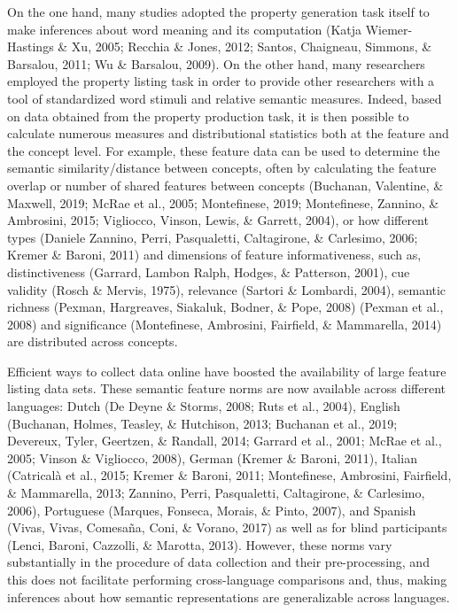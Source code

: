 \documentclass[man]{apa6}
\begin{document}
On the one hand, many studies adopted the property generation task itself to make inferences about word meaning and its computation (Katja Wiemer-Hastings \& Xu, 2005; Recchia \& Jones, 2012; Santos, Chaigneau, Simmons, \& Barsalou, 2011; Wu \& Barsalou, 2009). On the other hand, many researchers employed the property listing task in order to provide other researchers with a tool of standardized word stimuli and relative semantic measures. Indeed, based on data obtained from the property production task, it is then possible to calculate numerous measures and distributional statistics both at the feature and the concept level. For example, these feature data can be used to determine the semantic similarity/distance between concepts, often by calculating the feature overlap or number of shared features between concepts (Buchanan, Valentine, \& Maxwell, 2019; McRae et al., 2005; Montefinese, 2019; Montefinese, Zannino, \& Ambrosini, 2015; Vigliocco, Vinson, Lewis, \& Garrett, 2004), or how different types (Daniele Zannino, Perri, Pasqualetti, Caltagirone, \& Carlesimo, 2006; Kremer \& Baroni, 2011) and dimensions of feature informativeness, such as, distinctiveness (Garrard, Lambon Ralph, Hodges, \& Patterson, 2001), cue validity (Rosch \& Mervis, 1975), relevance (Sartori \& Lombardi, 2004), semantic richness (Pexman, Hargreaves, Siakaluk, Bodner, \& Pope, 2008) (Pexman et al., 2008) and significance (Montefinese, Ambrosini, Fairfield, \& Mammarella, 2014) are distributed across concepts.

Efficient ways to collect data online have boosted the availability of large feature listing data sets. These semantic feature norms are now available across different languages: Dutch (De Deyne \& Storms, 2008; Ruts et al., 2004), English (Buchanan, Holmes, Teasley, \& Hutchison, 2013; Buchanan et al., 2019; Devereux, Tyler, Geertzen, \& Randall, 2014; Garrard et al., 2001; McRae et al., 2005; Vinson \& Vigliocco, 2008), German (Kremer \& Baroni, 2011), Italian (Catricalà et al., 2015; Kremer \& Baroni, 2011; Montefinese, Ambrosini, Fairfield, \& Mammarella, 2013; Zannino, Perri, Pasqualetti, Caltagirone, \& Carlesimo, 2006), Portuguese (Marques, Fonseca, Morais, \& Pinto, 2007), and Spanish (Vivas, Vivas, Comesaña, Coni, \& Vorano, 2017) as well as for blind participants (Lenci, Baroni, Cazzolli, \& Marotta, 2013). However, these norms vary substantially in the procedure of data collection and their pre-processing, and this does not facilitate performing cross-language comparisons and, thus, making inferences about how semantic representations are generalizable across languages.
\end{document}
